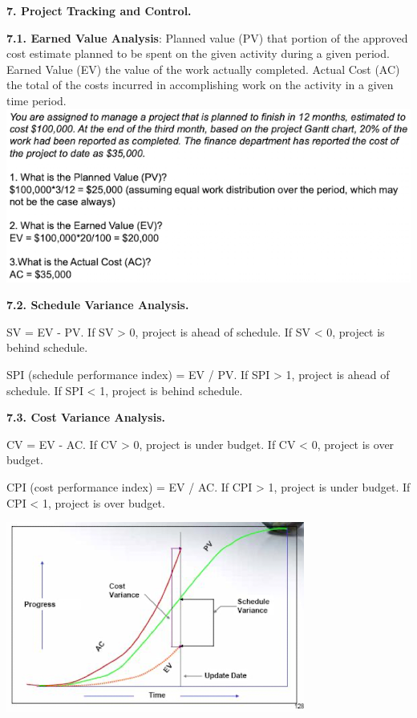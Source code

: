 \textbf{7. Project Tracking and Control.}

    \textbf{7.1. Earned Value Analysis}: Planned value (PV) that portion of the approved cost estimate planned to be spent on the given activity during a given period. Earned Value (EV) the value of the work actually completed. Actual Cost (AC) the total of the costs incurred in accomplishing work on the activity in a given time period.
    \includegraphics[width=\linewidth]{figs/SCR-20240606-pidd.png}

    \textbf{7.2. Schedule Variance Analysis.}

    SV = EV - PV. If SV > 0, project is ahead of schedule. If SV < 0, project is behind schedule.

    SPI (schedule performance index) = EV / PV. If SPI > 1, project is ahead of schedule. If SPI < 1, project is behind schedule.

    \textbf{7.3. Cost Variance Analysis.}

    CV = EV - AC. If CV > 0, project is under budget. If CV < 0, project is over budget.

    CPI (cost performance index) = EV / AC. If CPI > 1, project is under budget. If CPI < 1, project is over budget.

    \includegraphics[width=\linewidth]{figs/SCR-20240606-pjgq.png}